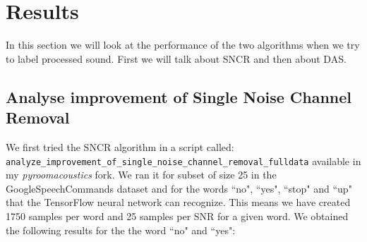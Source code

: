 \documentclass[11pt,a4paper,titlepage]{report}
\begin{document}
\chapter{Results}
\hspace*{0.6cm}
In this section we will look at the performance of the two algorithms when we try to label processed sound. First we will talk about SNCR and then about DAS.
\section{Analyse improvement of Single Noise Channel Removal}
\hspace*{0.6cm}
We first tried the SNCR algorithm in a script called:\\ \texttt{analyze\_improvement\_of\_single\_noise\_channel\_removal\_fulldata} available in my \textit{pyroomacoustics} fork. We ran it for subset of size 25 in the GoogleSpeechCommands dataset and for the words ``no", ``yes", ``stop" and ``up"  that the TensorFlow neural network can recognize. This means we have created 1750 samples per word and 25 samples per SNR for a given word. We obtained the following results for the the word ``no" and ``yes":\\
\end{document}
